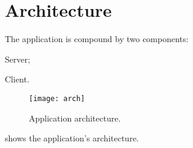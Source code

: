 \chapter{Architecture}\label{ch:arch}

The application is compound by two components:
\begin{enumerate*}[label=]
	\item Server;
	\item Client.
\end{enumerate*}

\begin{figure}[p]
    \centering
	\texttt{[image: arch]}
	\caption{Application architecture.}\label{fig:arch}
\end{figure}

 shows the application's architecture.




